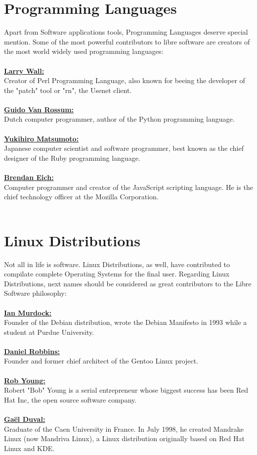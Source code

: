 \documentclass[10pt, a4paper, oneside]{report}
\begin{document}
\section* {Programming Languages}

Apart from Software applications tools, Programming Languages deserve special mention. Some of the most powerful contributors to libre software are creators of the most world widely used programming languages:\\
\\
\textbf{\underline{Larry Wall:}}\\
Creator of Perl Programming Language, also known for beeing the developer of the "patch" tool or "rn", the Usenet client.\\
\\
\textbf{\underline{Guido Van Rossum:}}\\
Dutch computer programmer, author of the Python programming language.\\
\\
\textbf{\underline{Yukihiro Matsumoto:}}\\
Japanese computer scientist and software programmer, best known as the chief designer of the Ruby programming language.\\
\\
\textbf{\underline{Brendan Eich:}}\\
Computer programmer and creator of the JavaScript scripting language. He is the chief technology officer at the Mozilla Corporation.\\
\\

\section* {Linux Distributions}

Not all in life is software. Linux Distributions, as well, have contributed to compilate complete Operating Systems for the final user.
Regarding Linux Distributions, next names should be considered as great contributors to the Libre Software philosophy:\\
\\
\textbf{\underline{Ian Murdock:}}\\
Founder of the Debian distribution, wrote the Debian Manifesto in 1993 while a student at Purdue University.\\
\\
\textbf{\underline{Daniel Robbins:}}\\
Founder and former chief architect of the Gentoo Linux project.\\
\\
\textbf{\underline{Rob Young:}}\\
Robert "Bob" Young is a serial entrepreneur whose biggest success has been Red Hat Inc, the open source software company.\\
\\
\textbf{\underline{Gaël Duval:}}\\
Graduate of the Caen University in France. In July 1998, he created Mandrake Linux (now Mandriva Linux), a Linux distribution originally based on Red Hat Linux and KDE.\\
\end{document}
